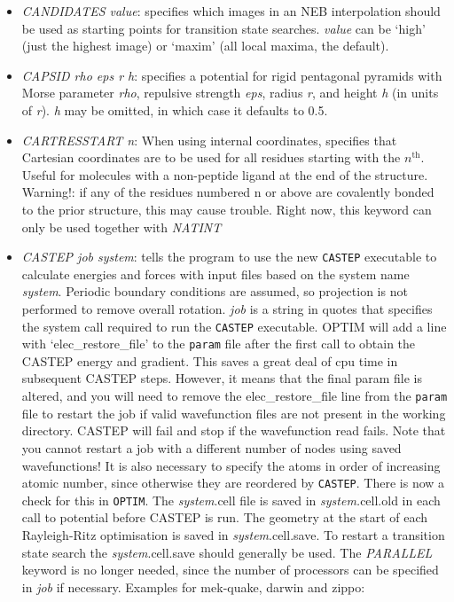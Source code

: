 \documentclass[12pt,a4paper,dvips]{article}
\begin{document}
\begin{itemize}
\item {\it CANDIDATES value}: specifies which images in an NEB interpolation should
be used as starting points for transition state searches. {\it value\/} can be `high'
(just the highest image)
or `maxim' (all local maxima, the default). 

\item {\it CAPSID rho eps r h}: specifies a potential for rigid pentagonal pyramids with
Morse parameter {\it rho}, repulsive strength {\it eps}, radius {\it r}, and height {\it h} (in
units of {\it r}).
{\it h} may be omitted, in which case it defaults to 0.5.

\item {\it CARTRESSTART n}: When using internal coordinates, specifies that
  Cartesian coordinates are to be used for all
  residues starting with the $n^{\mbox{th}}$. Useful for molecules with a
  non-peptide ligand at the end of the structure. Warning!: if any of the
  residues numbered n or above are covalently bonded to the prior structure,
  this may cause trouble. Right now, this keyword can only be used together
  with {\it NATINT\/}

\item {\it CASTEP job system\/}: tells the program to use the new {\tt CASTEP} 
executable to calculate energies and
forces with input files based on the system name {\it system\/}. Periodic boundary 
conditions are assumed, so projection is not performed to remove overall rotation.
{\it job} is a string in quotes that specifies the system call required to run 
the {\tt CASTEP} executable. 
OPTIM will add a line with `elec\_restore\_file' to the {\tt param} file after the
first call to obtain the CASTEP energy and gradient.
This saves a great deal of cpu time in subsequent CASTEP steps.
However, it means that the final param file is altered, and you will need
to remove the elec\_restore\_file line from the {\tt param} file to restart
the job if valid wavefunction files are not present in the working directory.
CASTEP will fail and stop if the wavefunction read fails.
Note that you cannot restart a job with a different number of nodes using
saved wavefunctions!
It is also necessary to specify the atoms in order of increasing atomic number,
since otherwise they are reordered by {\tt CASTEP}.
There is now a check for this in {\tt OPTIM}.
The {\it system}.cell file is saved in {\it system.}cell.old in each call to potential
before CASTEP is run.
The geometry at the start of each Rayleigh-Ritz optimisation is saved
in {\it system}.cell.save. 
To restart a transition state search the {\it system}.cell.save should generally
be used.
The {\it PARALLEL} keyword is no longer needed, since
the number of processors can be specified in {\it job} if necessary. Examples for mek-quake, darwin and zippo:


\end{itemize}
\end{document}

